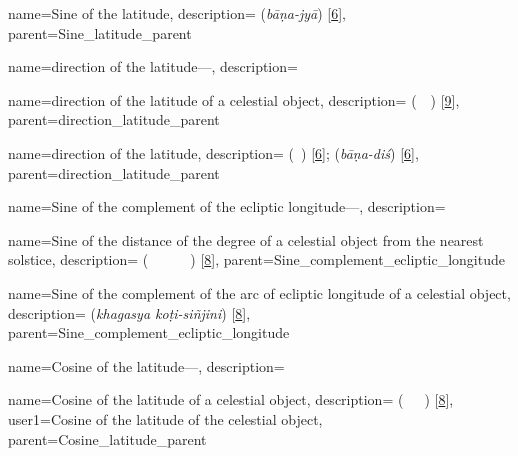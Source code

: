 {
        name={Sine of the latitude},
        description={  (\textit{bāṇa-jyā}) [\hyperlink{SEpass6}{6}]},
        parent={Sine_latitude_parent}
}

{       name={direction of the latitude---},
        description={\phantom{x}\nopagebreak}
}

{
        name={direction of the latitude of a celestial object},
        description={ (\jahat\idafaconsonant\ \ard\idafaconsonant\ \kawkab) [\hyperlink{PEpass9}{9}]},
        parent={direction_latitude_parent}
}

{
        name={direction of the latitude},
        description={ (\jahat\idafaconsonant\ \ard) [\hyperlink{PEpass6}{6}];  (\textit{bāṇa-diś}) [\hyperlink{SEpass6}{6}]},
        parent={direction_latitude_parent}
} 

{
        name={Sine of the complement of the ecliptic longitude---},
        description={\phantom{x}\nopagebreak}
}

{
        name={Sine of the distance of the degree of a celestial object from the nearest \mbox{solstice}},
        description={ (\jayb\idafaconsonant\ \bud\idafaconsonant\ \daraji\idafavowel\ \kawkab\ \az\ \inqilab\idafaconsonant\ \aqrab) [\hyperlink{PEpass8}{8}]},
        parent={Sine_complement_ecliptic_longitude}
}

{
        name={Sine of the complement of the arc of ecliptic longitude of a celestial object},
        description={\newline{} (\textit{khagasya koṭi-siñjini}) [\hyperlink{SEpass8}{8}]},
        parent={Sine_complement_ecliptic_longitude}
}        

{
        name={Cosine of the latitude---},
        description={\phantom{x}\nopagebreak}
}
        
{
        name={Cosine of the latitude of a celestial object},
        description={ (\jayb\idafaconsonant\ \tamam\idafaconsonant\ \ard\idafaconsonant\ \kawkab) [\hyperlink{PEpass8}{8}]},
        user1={Cosine of the latitude of the celestial object},
        parent={Cosine_latitude_parent}
}

